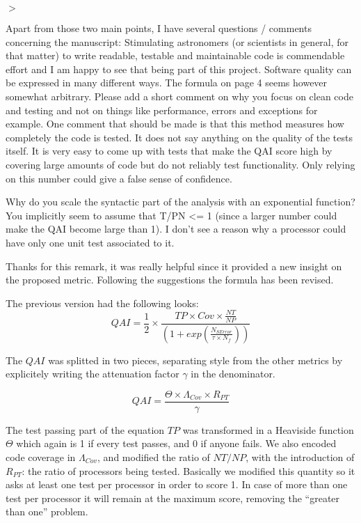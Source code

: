 \documentclass[a4paper,onecolumn,fleqn,usenatbib,useAMS]{mnrasr}
\newenvironment{myindentpar}[1]%
 {\begin{list}{}%
         \bigskip
         \color{refereecolor}
         {\setlength{\leftmargin}{#1}}%
         \itshape
         \item[$>$]%
 }
 {\end{list}}
\begin{document}
\begin{myindentpar}{1cm}
Apart from those two main points, I have several questions /
comments concerning the manuscript: Stimulating astronomers (or
scientists in general, for that matter) to write readable, testable
and maintainable code is commendable effort and I am happy to see that
being part of this project. Software quality can be expressed in many
different ways. The formula on page 4 seems however somewhat
arbitrary. Please add a short comment on why you focus on clean code
and testing and not on things like performance, errors and exceptions
for example.  One comment that should be made is that this method
measures how completely the code is tested. It does not say anything
on the quality of the tests itself. It is very easy to come up with
tests that make the QAI score high by covering large amounts of code
but do not reliably test functionality. Only relying on this number
could give a false sense of confidence.

Why do you scale the syntactic part of the analysis with an
exponential function?  
You implicitly seem to assume that T/PN <= 1
(since a larger number could make the QAI become large than 1). I
don't see a reason why a processor could have only one unit test
associated to it. 
\end{myindentpar}

%
Thanks for this remark, it was really helpful since it provided a
new insight on the proposed metric. Following the suggestions the formula has been
revised.

The previous version had the following looks:
\begin{displaymath}
 QAI = \frac{1}{2} \times \frac{ TP \times Cov \times \frac{NT}{NP}}
                               {\left( 1 + exp \left( \frac{N_{SError}}{\tau \times N_f} \right)\right)} 
\end{displaymath}


The $QAI$ was splitted in two pieces, separating style from the other metrics by
explicitely writing the attenuation factor $\gamma$ in the denominator.

\begin{displaymath}
 QAI = \frac{ \Theta \times \Lambda_{Cov} \times R_{PT}}{\gamma} 
\end{displaymath} 

The test passing part of the equation $TP$ was transformed in a Heaviside function
$\Theta$ which again is 1 if every test passes, and 0 if anyone fails.
We also encoded code coverage in $\Lambda_{Cov}$, and modified the ratio of $NT/NP$, 
with the introduction of $R_{PT}$: the ratio of processors being tested.
Basically we modified this quantity so it asks at least one test per processor
in order to score 1. In case of more than one test per processor it will remain
at the maximum score, removing the ``greater than one'' problem.
\end{document}
